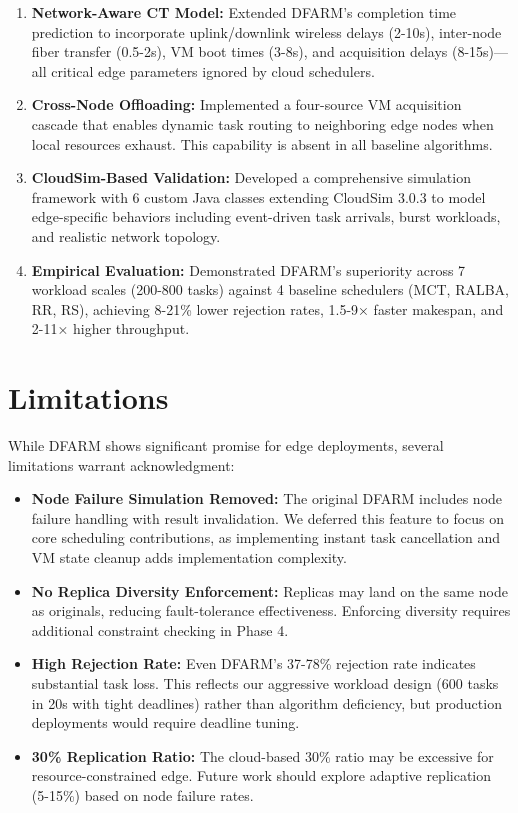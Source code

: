 \documentclass[12pt]{report}
\begin{document}
\begin{enumerate}
    \item \textbf{Network-Aware CT Model:} Extended DFARM's completion time prediction to incorporate uplink/downlink wireless delays (2-10s), inter-node fiber transfer (0.5-2s), VM boot times (3-8s), and acquisition delays (8-15s)—all critical edge parameters ignored by cloud schedulers.
    
    \item \textbf{Cross-Node Offloading:} Implemented a four-source VM acquisition cascade that enables dynamic task routing to neighboring edge nodes when local resources exhaust. This capability is absent in all baseline algorithms.
    
    \item \textbf{CloudSim-Based Validation:} Developed a comprehensive simulation framework with 6 custom Java classes extending CloudSim 3.0.3 to model edge-specific behaviors including event-driven task arrivals, burst workloads, and realistic network topology.
    
    \item \textbf{Empirical Evaluation:} Demonstrated DFARM's superiority across 7 workload scales (200-800 tasks) against 4 baseline schedulers (MCT, RALBA, RR, RS), achieving 8-21\% lower rejection rates, 1.5-9× faster makespan, and 2-11× higher throughput.
\end{enumerate}

\section{Limitations}

While DFARM shows significant promise for edge deployments, several limitations warrant acknowledgment:

\begin{itemize}
    \item \textbf{Node Failure Simulation Removed:} The original DFARM includes node failure handling with result invalidation. We deferred this feature to focus on core scheduling contributions, as implementing instant task cancellation and VM state cleanup adds implementation complexity.
    
    \item \textbf{No Replica Diversity Enforcement:} Replicas may land on the same node as originals, reducing fault-tolerance effectiveness. Enforcing diversity requires additional constraint checking in Phase 4.
    
    \item \textbf{High Rejection Rate:} Even DFARM's 37-78\% rejection rate indicates substantial task loss. This reflects our aggressive workload design (600 tasks in 20s with tight deadlines) rather than algorithm deficiency, but production deployments would require deadline tuning.
    
    \item \textbf{30\% Replication Ratio:} The cloud-based 30\% ratio may be excessive for resource-constrained edge. Future work should explore adaptive replication (5-15\%) based on node failure rates.
\end{itemize}
\end{document}
